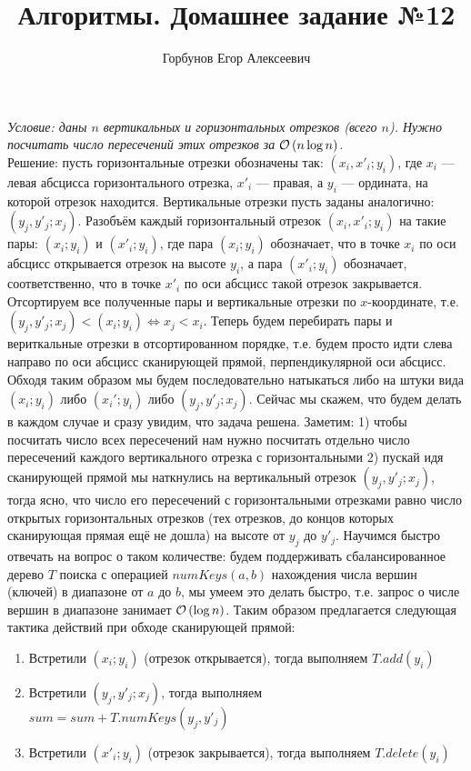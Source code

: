 
\title{Алгоритмы. Домашнее задание №12}
\author{Горбунов Егор Алексеевич}


\maketitle

\textit{
	Условие: даны $n$ вертикальных и горизонтальных отрезков (всего $n$). Нужно посчитать число пересечений
	этих отрезков за $\mathcal{O}\left(n\log{n}\right)$.
}\\
Решение: пусть горизонтальные отрезки обозначены так: $(x_i, x'_i; y_i)$, где $x_i$ --- левая абсцисса горизонтального отрезка, $x'_i$ --- правая, а $y_i$ --- ордината, на которой отрезок находится. Вертикальные отрезки пусть заданы аналогично: $(y_j, y'_j; x_j)$. Разобъём каждый горизонтальный отрезок $(x_i, x'_i; y_i)$
на такие пары: $(x_i; y_i)$ и $(x'_i; y_i)$, где пара $(x_i; y_i)$ обозначает, что в точке $x_i$ по оси абсцисс
открывается отрезок на высоте $y_i$, а пара $(x'_i; y_i)$ обозначает, соответственно, что в точке $x'_i$ по оси абсцисс такой отрезок закрывается. Отсортируем все полученные пары и вертикальные отрезки по $x$-координате, т.е. $(y_j, y'_j; x_j) < (x_i; y_i) \iff x_j < x_i$. Теперь будем перебирать пары и вериткальные отрезки в отсортированном порядке, т.е. будем просто идти слева направо по оси абсцисс сканирующей прямой, перпендикулярной оси абсцисс. Обходя таким образом мы будем последовательно натыкаться либо на штуки вида $(x_i; y_i)$ либо $(x_i'; y_i)$ либо $(y_j, y'_j; x_j)$. Сейчас мы скажем, что будем делать в каждом случае и сразу увидим, что задача решена.
Заметим: 1) чтобы посчитать число всех пересечений нам нужно посчитать отдельно число пересечений каждого вертикального отрезка с горизонтальными 2) пускай идя сканирующей прямой мы наткнулись на вертикальный отрезок $(y_j, y'_j; x_j)$, тогда ясно, что число его пересечений с горизонтальными отрезками равно число открытых горизонтальных отрезков (тех отрезков, до концов которых сканирующая прямая ещё не дошла) на высоте от $y_j$ до $y'_j$. Научимся быстро отвечать на вопрос о таком количестве: будем поддерживать сбалансированное дерево 
$T$
поиска с операцией $numKeys(a, b)$ нахождения числа вершин (ключей) в диапазоне от $a$ до $b$, мы умеем это делать быстро, т.е. запрос о числе вершин в диапазоне занимает $\mathcal{O}\left(\log{n}\right)$.
Таким образом предлагается следующая тактика действий при обходе сканирующей прямой:
\begin{enumerate}
	\item Встретили $(x_i; y_i)$ (отрезок открывается), тогда выполняем $T.add(y_i)$
	\item Встретили $(y_j, y'_j; x_j)$, тогда выполняем $sum = sum + T.numKeys(y_j, y'_j)$
	\item Встретили $(x'_i; y_i)$ (отрезок закрывается), тогда выполняем $T.delete(y_i)$
\end{enumerate}
